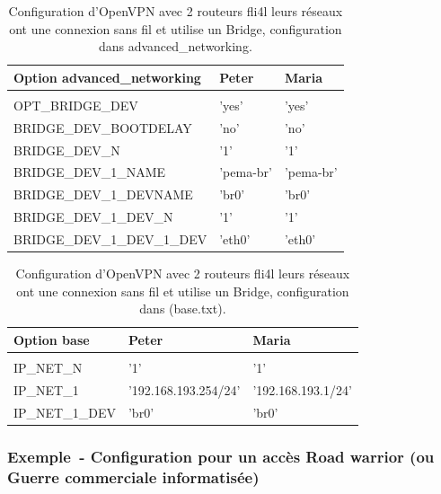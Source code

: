 \begin{table}[htbp]
  \begin{scriptsize}
    \begin{tabular}{lll}
     Option advanced\_networking   & Peter           & Maria       \\
      \hline \\
      OPT\_BRIDGE\_DEV             & 'yes'           & 'yes'       \\
      BRIDGE\_DEV\_BOOTDELAY       & 'no'            & 'no'        \\
      BRIDGE\_DEV\_N               & '1'             & '1'         \\
      BRIDGE\_DEV\_1\_NAME         & 'pema-br'       & 'pema-br'   \\
      BRIDGE\_DEV\_1\_DEVNAME      & 'br0'           & 'br0'       \\
      BRIDGE\_DEV\_1\_DEV\_N       & '1'             & '1'         \\
      BRIDGE\_DEV\_1\_DEV\_1\_DEV  & 'eth0'          & 'eth0'      \\
    \end{tabular}
  \end{scriptsize}
  \caption{Configuration d'OpenVPN avec 2 routeurs fli4l leurs réseaux ont une connexion sans fil et utilise un Bridge, configuration dans advanced\_networking.}
\end{table}

\begin{table}[htbp]
  \begin{scriptsize}
    \begin{tabular}{lll}
     Option base            & Peter                 & Maria                \\
      \hline \\
      IP\_NET\_N            & '1'                   & '1'                  \\
      IP\_NET\_1            & '192.168.193.254/24'  & '192.168.193.1/24'   \\
      IP\_NET\_1\_DEV       & 'br0'                 & 'br0'                \\
    \end{tabular}
  \end{scriptsize}
  \caption{Configuration d'OpenVPN avec 2 routeurs fli4l leurs réseaux ont une connexion sans fil et utilise un Bridge, configuration dans (base.txt).}
\end{table}

\subsubsection{Exemple~- Configuration pour un accès Road warrior (ou Guerre commerciale informatisée)}

